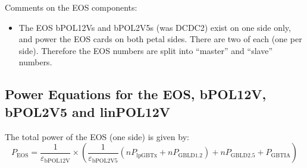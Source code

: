 \noindent
Comments on the EOS components:

\begin{itemize}
\item The EOS bPOL12Vs and bPOL2V5s (was DCDC2) exist on one side only, and power the EOS cards on both petal
sides. There are two of each (one per side). Therefore the EOS numbers are split into ``master'' and ``slave'' numbers.
\end{itemize}


\subsection{Power Equations for the EOS, bPOL12V, bPOL2V5 and linPOL12V}

The total power of the EOS (one side) is given by:
\begin{equation}
P_\text{EOS} = \frac{1}{\varepsilon_\text{bPOL12V}}\times
  \left( \frac{1}{\varepsilon_\text{bPOL2V5}} (n P_\text{lpGBTx} + n P_\text{GBLD1.2}) + n P_\text{GBLD2.5} + P_\text{GBTIA} \right)
\end{equation}

